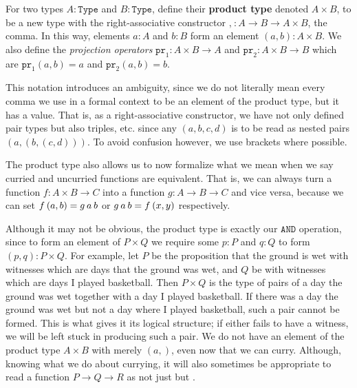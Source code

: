 \documentclass[11pt]{article}
\begin{document}
\begin{definition}
For two types $A \colon \mathtt{Type}$ and $B \colon \mathtt{Type}$, define their \textbf{product type} denoted $A \times B$, to be a new type with the right-associative constructor $\mathtt{,} \hspace{1pt}\colon A \to B \to A \times B$, the comma. In this way, elements $a \colon A$ and $b \colon B$ form an element $(a,b) \colon A \times B$. We also define the \emph{projection operators} $\mathtt{pr}_1 \colon A \times B \to A$ and $\mathtt{pr}_2 \colon A \times B \to B$ which are $\mathtt{pr}_1 (a,b) = a$ and $\mathtt{pr}_2 (a,b) = b$.
\end{definition}

This notation introduces an ambiguity, since we do not literally mean every comma we use in a formal context to be an element of the product type, but it has a value. That is, as a right-associative constructor, we have not only defined pair types but also triples, etc. since any $(a,b,c,d)$ is to be read as nested pairs $(a,(b,(c,d)))$. To avoid confusion however, we use brackets where possible.

The product type also allows us to now formalize what we mean when we say curried and uncurried functions are equivalent. That is, we can always turn a function $f \colon A \times B \to C$ into a function $g\colon A \to B \to C$ and vice versa, because we can set $f \hspace{0.2em} (a,b) = g \hspace{0.2em} a \hspace{0.2em} b$ or $g \hspace{0.2em} a \hspace{0.2em} b = f \hspace{0.2em} (x,y)$ respectively.

Although it may not be obvious, the product type is exactly our $\mathtt{AND}$ operation, since to form an element of $P \times Q$ we require some $p \colon P$ and $q \colon Q$ to form $(p,q) \colon P \times Q$. For example, let $P$ be the proposition that the ground is wet with witnesses which are days that the ground was wet, and $Q$ be  with witnesses which are days I played basketball. Then $P \times Q$ is the type of pairs of a day the ground was wet together with a day I played basketball. If there was a day the ground was wet but not a day where I played basketball, such a pair cannot be formed. This is what gives it its logical  structure; if either fails to have a witness, we will be left stuck in producing such a pair. We do not have an element of the product type $A \times B$ with merely $(a,)$, even now that we can curry. Although, knowing what we do about currying, it will also sometimes be appropriate to read a function $P \to Q \to R$ as not just  but .
\end{document}
